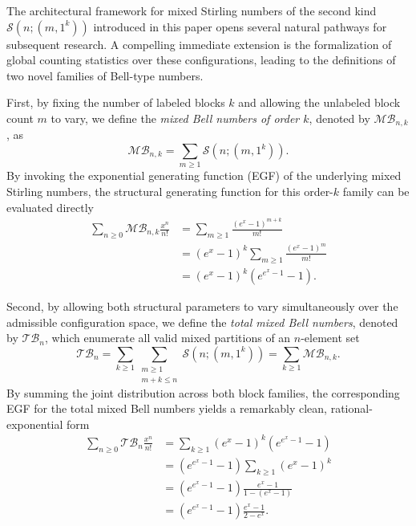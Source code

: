 \documentclass[12pt]{amsart}
\theoremstyle{definition}
\begin{document}
The architectural framework for mixed Stirling numbers of the second kind $\mathcal{S}(n;(m,1^k))$ introduced in this paper opens several natural pathways for subsequent research. A compelling immediate extension is the formalization of global counting statistics over these configurations, leading to the definitions of two novel families of Bell-type numbers.

First, by fixing the number of labeled blocks $k$ and allowing the unlabeled block count $m$ to vary, we define the \textit{mixed Bell numbers of order $k$}, denoted by $\mathcal{MB}_{n,k}$, as
\begin{equation}
    \mathcal{MB}_{n,k} = \sum_{m \ge 1} \mathcal{S}(n; (m, 1^k)).
\end{equation}
By invoking the exponential generating function (EGF) of the underlying mixed Stirling numbers, the structural generating function for this order-$k$ family can be evaluated directly
\begin{align*}
    \sum_{n \ge 0} \mathcal{MB}_{n,k} \frac{x^n}{n!} &= \sum_{m \ge 1} \frac{(e^x - 1)^{m+k}}{m!} \\
    &= (e^x - 1)^k \sum_{m \ge 1} \frac{(e^x - 1)^m}{m!} \\
    &= (e^x - 1)^k \left( e^{e^x - 1} - 1 \right).
\end{align*}

Second, by allowing both structural parameters to vary simultaneously over the admissible configuration space, we define the \textit{total mixed Bell numbers}, denoted by $\mathcal{TB}_n$, which enumerate all valid mixed partitions of an $n$-element set
\begin{equation}
    \mathcal{TB}_n = \sum_{k \ge 1} \sum_{\substack{m \ge 1 \\ m+k \le n}} \mathcal{S}(n; (m, 1^k)) = \sum_{k \ge 1} \mathcal{MB}_{n,k}.
\end{equation}
By summing the joint distribution across both block families, the corresponding EGF for the total mixed Bell numbers yields a remarkably clean, rational-exponential form
\begin{align*}
    \sum_{n \ge 0} \mathcal{TB}_n \frac{x^n}{n!} &= \sum_{k \ge 1} (e^x - 1)^k \left( e^{e^x - 1} - 1 \right) \\
    &= \left( e^{e^x - 1} - 1 \right) \sum_{k \ge 1} (e^x - 1)^k \\
    &= \left( e^{e^x - 1} - 1 \right) \frac{e^x - 1}{1 - (e^x - 1)} \\
    &= \left( e^{e^x - 1} - 1 \right) \frac{e^x - 1}{2 - e^x}.
\end{align*}
\end{document}
